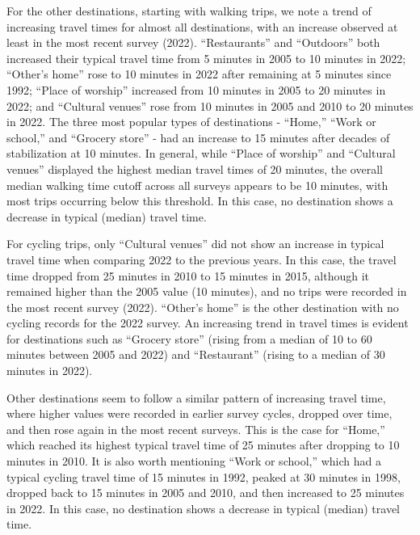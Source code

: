 \documentclass[preprint, 3p,
authoryear]{elsarticle} %
\begin{document}
For the other destinations, starting with walking trips, we note a trend
of increasing travel times for almost all destinations, with an increase
observed at least in the most recent survey (2022). ``Restaurants'' and
``Outdoors'' both increased their typical travel time from 5 minutes in
2005 to 10 minutes in 2022; ``Other's home'' rose to 10 minutes in 2022
after remaining at 5 minutes since 1992; ``Place of worship'' increased
from 10 minutes in 2005 to 20 minutes in 2022; and ``Cultural venues''
rose from 10 minutes in 2005 and 2010 to 20 minutes in 2022. The three
most popular types of destinations - ``Home,'' ``Work or school,'' and
``Grocery store'' - had an increase to 15 minutes after decades of
stabilization at 10 minutes. In general, while ``Place of worship'' and
``Cultural venues'' displayed the highest median travel times of 20
minutes, the overall median walking time cutoff across all surveys
appears to be 10 minutes, with most trips occurring below this
threshold. In this case, no destination shows a decrease in typical
(median) travel time.

For cycling trips, only ``Cultural venues'' did not show an increase in
typical travel time when comparing 2022 to the previous years. In this
case, the travel time dropped from 25 minutes in 2010 to 15 minutes in
2015, although it remained higher than the 2005 value (10 minutes), and
no trips were recorded in the most recent survey (2022). ``Other's
home'' is the other destination with no cycling records for the 2022
survey. An increasing trend in travel times is evident for destinations
such as ``Grocery store'' (rising from a median of 10 to 60 minutes
between 2005 and 2022) and ``Restaurant'' (rising to a median of 30
minutes in 2022).

Other destinations seem to follow a similar pattern of increasing travel
time, where higher values were recorded in earlier survey cycles,
dropped over time, and then rose again in the most recent surveys. This
is the case for ``Home,'' which reached its highest typical travel time
of 25 minutes after dropping to 10 minutes in 2010. It is also worth
mentioning ``Work or school,'' which had a typical cycling travel time
of 15 minutes in 1992, peaked at 30 minutes in 1998, dropped back to 15
minutes in 2005 and 2010, and then increased to 25 minutes in 2022. In
this case, no destination shows a decrease in typical (median) travel
time.
\end{document}
